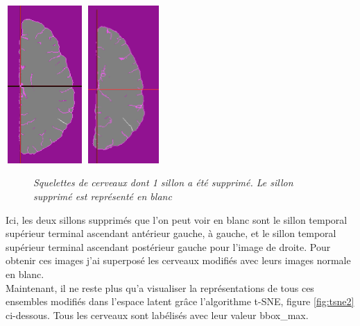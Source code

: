 \documentclass[12pt, oneside, a4paper, titlepage]{article}
\begin{document}
\vspace{0.5cm} 

\centerline{\includegraphics[width=3cm,height=6cm]{benchmark1.png}\hspace{5mm}\includegraphics[width=3cm, height=6cm]{benchmark2.png}}
\begin{figure}[H]
    \centering
    \caption{\textit{Squelettes de cerveaux dont 1 sillon a été supprimé. Le sillon supprimé est représenté en blanc}}
    \label{fig:bench}
\end{figure}

Ici, les deux sillons supprimés que l'on peut voir en blanc sont le sillon temporal supérieur terminal ascendant antérieur gauche, à gauche, et le sillon temporal supérieur terminal ascendant postérieur gauche pour l'image de droite. Pour obtenir ces images j'ai superposé les cerveaux modifiés avec leurs images normale en blanc. \\

Maintenant, il ne reste plus qu'a visualiser la représentations de tous ces ensembles modifiés dans l'espace latent grâce l'algorithme t-SNE, figure \ref{fig:tsne2} ci-dessous. Tous les cerveaux sont labélisés avec leur valeur bbox\_max.
\end{document}
